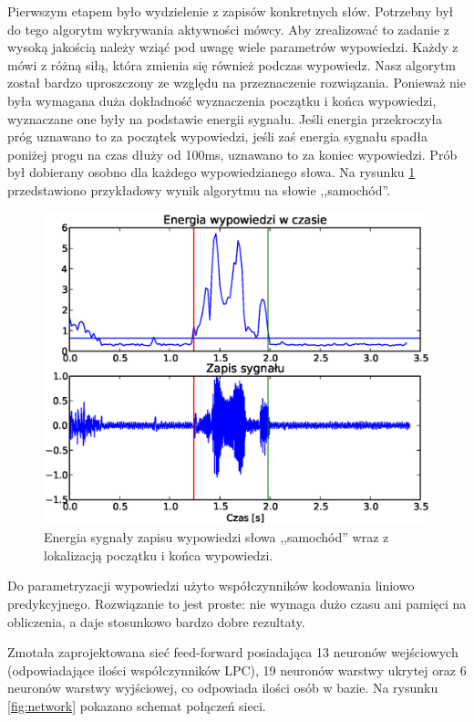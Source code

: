\documentclass[a4paper]{article}
\begin{document}
Pierwszym etapem było wydzielenie z zapisów konkretnych słów. Potrzebny był do
tego algorytm wykrywania aktywności mówcy. Aby zrealizować to zadanie z wysoką
jakością należy wziąć pod uwagę wiele parametrów wypowiedzi. Każdy z mówi z
różną siłą, która zmienia się również podczas wypowiedz. Nasz algorytm został
bardzo uproszczony ze względu na przeznaczenie rozwiązania. Ponieważ nie była
wymagana duża dokładność wyznaczenia początku i końca wypowiedzi, wyznaczane
one były na podstawie energii sygnału. Jeśli energia przekroczyła próg uznawano
to za początek wypowiedzi, jeśli zaś energia sygnału spadła poniżej progu na
czas dłuży od 100ms, uznawano to za koniec wypowiedzi. Prób był dobierany
osobno dla każdego wypowiedzianego słowa. Na rysunku \ref{fig:say}
przedstawiono przykładowy wynik algorytmu na słowie ,,samochód''.

\begin{figure}[h!]
    \includegraphics[width=\textwidth]{say_samochod}
    \caption{Energia sygnały zapisu wypowiedzi słowa ,,samochód'' wraz z
    lokalizacją początku i końca wypowiedzi.}
    \label{fig:say}
\end{figure}

Do parametryzacji wypowiedzi użyto współczynników kodowania liniowo predykcyjnego.
Rozwiązanie to jest proste: nie wymaga dużo czasu ani pamięci na obliczenia, a
daje stosunkowo bardzo dobre rezultaty.

Zmotała zaprojektowana sieć feed-forward posiadająca 13 neuronów wejściowych
(odpowiadające ilości współczynników LPC), 19 neuronów warstwy ukrytej oraz 6
neuronów warstwy wyjściowej, co odpowiada ilości osób w bazie. Na rysunku
\ref{fig:network} pokazano schemat połączeń sieci.
\end{document}
